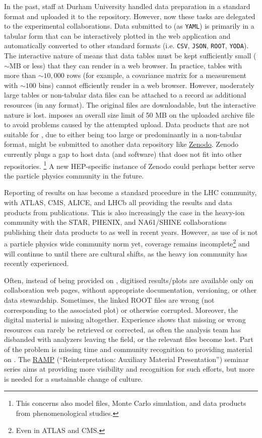 \documentclass[11pt]{article}
\begin{document}
In the past, \hepdata staff at Durham University handled data preparation in a standard format and uploaded it to the repository.
However, now these tasks are delegated to the experimental collaborations.
Data submitted to \hepdata (as \texttt{YAML}) is primarily in a tabular form that can be interactively plotted in the web application and automatically converted to other standard formats (i.e. \texttt{CSV}, \texttt{JSON}, \texttt{ROOT}, \texttt{YODA}).
The interactive nature of \hepdata means that data tables must be kept sufficiently small ($\sim$MB or less) that they can render in a web browser.
In practice, tables with more than $\sim 10,000$ rows (for example, a covariance matrix for a measurement with $\sim 100$ bins) cannot efficiently render in a web browser.
However, moderately large tables or non-tabular data files can be attached to a \hepdata record as additional resources (in any format).
The original files are downloadable, but the interactive nature is lost.
\hepdata imposes an overall size limit of 50 MB on the uploaded archive file to avoid problems caused by the attempted upload. 
%
Data products that are not suitable for \hepdata, due to either being too large or predominantly in a non-tabular format, might be submitted to another data repository like \href{https://zenodo.org/}{Zenodo}.
Zenodo currently plugs a gap to host data (and software) that does not fit into other repositories.%
\footnote{This concerns also model files, Monte Carlo simulation, and data products from phenomenological studies.}
A new \gls{HEP}-specific instance of Zenodo could perhaps better serve the particle physics community in the future.


Reporting of results on \hepdata has become a standard procedure in the \gls{LHC} community, with \gls{ATLAS}, \gls{CMS}, \gls{ALICE}, and \gls{LHCb} all providing the results and data products from publications.
This is also increasingly the case in the heavy-ion community with the \gls{STAR}, \gls{PHENIX}, and NA61/SHINE collaborations publishing their data products to \hepdata as well in recent years.
However, as use of \hepdata is not a particle physics wide community norm yet, coverage remains incomplete\footnote{Even in \gls{ATLAS} and \gls{CMS}.} and will continue to until there are cultural shifts, as the heavy ion community has recently experienced.

Often, instead of being provided on \hepdata, digitised results/plots are available only on collaboration web pages, without appropriate documentation, versioning, or other data stewardship.
Sometimes, the linked ROOT files are wrong (not corresponding to the associated plot) or otherwise corrupted.
Moreover, the digital material is missing altogether.
Experience shows that missing or wrong resources can rarely be retrieved or corrected, as often the analysis team has disbanded with analyzers leaving the field, or the relevant files become lost. 
Part of the problem is missing time and community recognition to providing material on \hepdata.
The \href{https://indico.cern.ch/category/14155/}{RAMP} (``Reinterpretation: Auxiliary Material Presentation'') seminar series aims at providing more visibility and recognition for such efforts,  but more is needed for a 
sustainable change of culture. 
\end{document}
